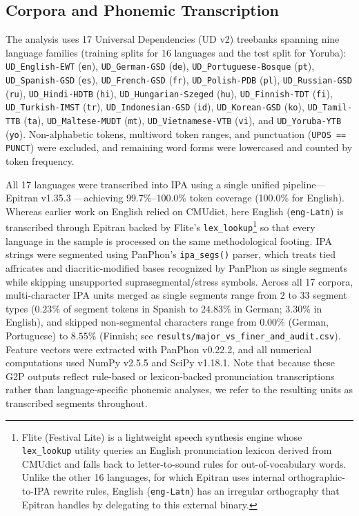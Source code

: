 \documentclass{interact}
\begin{document}
\subsection{Corpora and Phonemic Transcription}
The analysis uses 17 Universal Dependencies (UD v2) treebanks \citep{nivre2020universal} spanning nine language families (training splits for 16 languages and the test split for Yoruba): \texttt{UD\_English-EWT} (\texttt{en}), \texttt{UD\_German-GSD} (\texttt{de}), \texttt{UD\_Portuguese-Bosque} (\texttt{pt}), \texttt{UD\_Spanish-GSD} (\texttt{es}), \texttt{UD\_French-GSD} (\texttt{fr}), \texttt{UD\_Polish-PDB} (\texttt{pl}), \texttt{UD\_Russian-GSD} (\texttt{ru}), \texttt{UD\_Hindi-HDTB} (\texttt{hi}), \texttt{UD\_Hungarian-Szeged} (\texttt{hu}), \texttt{UD\_Finnish-TDT} (\texttt{fi}), \texttt{UD\_Turkish-IMST} (\texttt{tr}), \texttt{UD\_Indonesian-GSD} (\texttt{id}), \texttt{UD\_Korean-GSD} (\texttt{ko}), \texttt{UD\_Tamil-TTB} (\texttt{ta}), \texttt{UD\_Maltese-MUDT} (\texttt{mt}), \texttt{UD\_Vietnamese-VTB} (\texttt{vi}), and \texttt{UD\_Yoruba-YTB} (\texttt{yo}). Non-alphabetic tokens, multiword token ranges, and punctuation (\texttt{UPOS == PUNCT}) were excluded, and remaining word forms were lowercased and counted by token frequency.

All 17 languages were transcribed into IPA using a single unified pipeline---Epitran v1.35.3 \citep{mortensen2018epitran}---achieving 99.7\%--100.0\% token coverage (100.0\% for English). Whereas earlier work on English \citep{araujo2013thesis} relied on CMUdict, here English (\texttt{eng-Latn}) is transcribed through Epitran backed by Flite's \texttt{lex\_lookup}\footnote{Flite (Festival Lite) is a lightweight speech synthesis engine whose \texttt{lex\_lookup} utility queries an English pronunciation lexicon derived from CMUdict and falls back to letter-to-sound rules for out-of-vocabulary words. Unlike the other 16 languages, for which Epitran uses internal orthographic-to-IPA rewrite rules, English (\texttt{eng-Latn}) has an irregular orthography that Epitran handles by delegating to this external binary.} so that every language in the sample is processed on the same methodological footing. IPA strings were segmented using PanPhon's \texttt{ipa\_segs()} parser, which treats tied affricates and diacritic-modified bases recognized by PanPhon as single segments while skipping unsupported suprasegmental/stress symbols. Across all 17 corpora, multi-character IPA units merged as single segments range from $2$ to $33$ segment types ($0.23\%$ of segment tokens in Spanish to $24.83\%$ in German; $3.30\%$ in English), and skipped non-segmental characters range from $0.00\%$ (German, Portuguese) to $8.55\%$ (Finnish; see \texttt{results/major\_vs\_finer\_and\_audit.csv}). Feature vectors were extracted with PanPhon v0.22.2, and all numerical computations used NumPy v2.5.5 and SciPy v1.18.1. Note that because these G2P outputs reflect rule-based or lexicon-backed pronunciation transcriptions rather than language-specific phonemic analyses, we refer to the resulting units as transcribed segments throughout.
\end{document}
